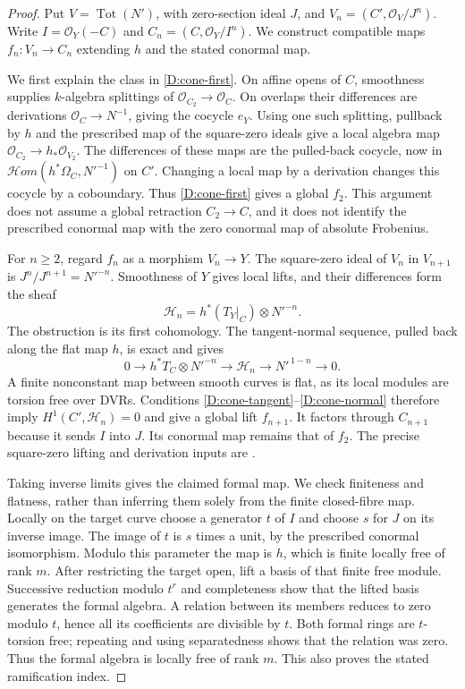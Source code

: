 \begin{proof}
Put $V=\operatorname{Tot}(N')$, with zero-section ideal $J$,
and $V_n=(C',\mathcal O_V/J^n)$.  Write $I=\mathcal O_Y(-C)$
and $C_n=(C,\mathcal O_Y/I^n)$.  We construct compatible maps
$f_n:V_n\to C_n$ extending $h$ and the stated conormal map.

We first explain the class in \eqref{D:cone-first}.  On affine
opens of $C$, smoothness supplies $k$-algebra splittings of
$\mathcal O_{C_2}\to\mathcal O_C$.  On overlaps their differences
are derivations $\mathcal O_C\to N^{-1}$, giving the cocycle $e_Y$.
Using one such splitting, pullback by $h$ and the prescribed
map of the square-zero ideals give a local algebra map
$\mathcal O_{C_2}\to h_*\mathcal O_{V_2}$.  The differences of
these maps are the pulled-back cocycle, now in
$\mathcal Hom(h^*\Omega_C,N'^{-1})$ on $C'$.
Changing a local map by a derivation changes this cocycle by
a coboundary.  Thus \eqref{D:cone-first} gives a global $f_2$.
This argument does not assume a global retraction $C_2\to C$,
and it does not identify the prescribed conormal map with the
zero conormal map of absolute Frobenius.

For $n\geq2$, regard $f_n$ as a morphism $V_n\to Y$.
The square-zero ideal of $V_n$ in $V_{n+1}$ is
$J^n/J^{n+1}=N'^{-n}$.  Smoothness of $Y$ gives local lifts,
and their differences form the sheaf
\[
 \mathcal H_n=h^*(T_Y|_C)\otimes N'^{-n}.
 \tag{FL}
\]
The obstruction is its first cohomology.  The tangent-normal
sequence, pulled back along the flat map $h$, is exact and gives
\[
 0\longrightarrow h^*T_C\otimes N'^{-n}
 \longrightarrow\mathcal H_n
 \longrightarrow N'^{\,1-n}\longrightarrow0.
 \tag{FN}
\]
A finite nonconstant map between smooth curves is flat, as
its local modules are torsion free over DVRs.  Conditions
\eqref{D:cone-tangent}--\eqref{D:cone-normal} therefore imply
$H^1(C',\mathcal H_n)=0$ and give a global lift $f_{n+1}$.
It factors through $C_{n+1}$ because it sends $I$ into $J$.
Its conormal map remains that of $f_2$.
The precise square-zero lifting and derivation inputs are
\cite[Lemmas 17.28.11, 37.9.4--5 and 37.11.7,
tags 01UP, 04FH, 04FJ and 02H6]{StacksBNegativeCurve}.

Taking inverse limits gives the claimed formal map.  We check
finiteness and flatness, rather than inferring them solely from
the finite closed-fibre map.  Locally on the target curve choose
a generator $t$ of $I$ and choose $s$ for $J$ on its inverse
image.  The image of $t$ is $s$ times a unit, by the prescribed
conormal isomorphism.  Modulo this parameter the map is $h$,
which is finite locally free of rank $m$.  After restricting
the target open, lift a basis of that finite free module.
Successive reduction modulo $t^r$ and completeness show that
the lifted basis generates the formal algebra.  A relation
between its members reduces to zero modulo $t$, hence all its
coefficients are divisible by $t$.  Both formal rings are
$t$-torsion free; repeating and using separatedness shows that
the relation was zero.  Thus the formal algebra is locally free
of rank $m$.  This also proves the stated ramification index.


\end{proof}
